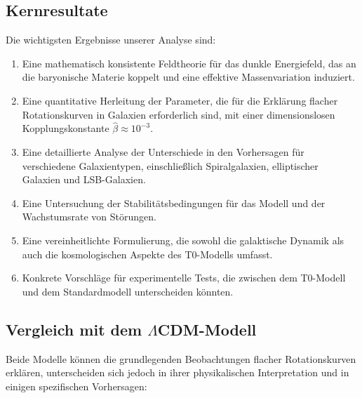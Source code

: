 \documentclass[a4paper,12pt]{article}
\begin{document}
	\subsection{Kernresultate}
	
	Die wichtigsten Ergebnisse unserer Analyse sind:
	
	\begin{enumerate}
		\item Eine mathematisch konsistente Feldtheorie für das dunkle Energiefeld, das an die baryonische Materie koppelt und eine effektive Massenvariation induziert.
		
		\item Eine quantitative Herleitung der Parameter, die für die Erklärung flacher Rotationskurven in Galaxien erforderlich sind, mit einer dimensionslosen Kopplungskonstante $\hat{\beta} \approx 10^{-3}$.
		
		\item Eine detaillierte Analyse der Unterschiede in den Vorhersagen für verschiedene Galaxientypen, einschließlich Spiralgalaxien, elliptischer Galaxien und LSB-Galaxien.
		
		\item Eine Untersuchung der Stabilitätsbedingungen für das Modell und der Wachstumsrate von Störungen.
		
		\item Eine vereinheitlichte Formulierung, die sowohl die galaktische Dynamik als auch die kosmologischen Aspekte des T0-Modells umfasst.
		
		\item Konkrete Vorschläge für experimentelle Tests, die zwischen dem T0-Modell und dem Standardmodell unterscheiden könnten.
	\end{enumerate}
	
	\subsection{Vergleich mit dem $\Lambda$CDM-Modell}
	
	Beide Modelle können die grundlegenden Beobachtungen flacher Rotationskurven erklären, unterscheiden sich jedoch in ihrer physikalischen Interpretation und in einigen spezifischen Vorhersagen:
	
\end{document}
